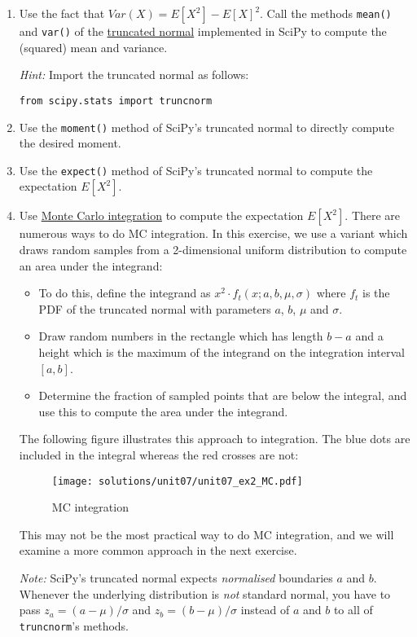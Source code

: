 \documentclass{scrartcl}
\providecommand{\tightlist}{%
      \setlength{\itemsep}{0pt}\setlength{\parskip}{0pt}}
\begin{document}
\begin{enumerate}
\def\labelenumi{\arabic{enumi}.}
\item
  Use the fact that \(Var(X) = E[X^2] - E[X]^2\). Call the methods
  \texttt{mean()} and \texttt{var()} of the
  \href{https://docs.scipy.org/doc/scipy/reference/generated/scipy.stats.truncnorm.html}{truncated
  normal} implemented in SciPy to compute the (squared) mean and
  variance.

  \emph{Hint:} Import the truncated normal as follows:

\begin{verbatim}
from scipy.stats import truncnorm
\end{verbatim}
\item
  Use the \texttt{moment()} method of SciPy's truncated normal to
  directly compute the desired moment.
\item
  Use the \texttt{expect()} method of SciPy's truncated normal to
  compute the expectation \(E[X^2]\).
\item
  Use \href{https://en.wikipedia.org/wiki/Monte_Carlo_integration}{Monte
  Carlo integration} to compute the expectation \(E[X^2]\). There are
  numerous ways to do MC integration. In this exercise, we use a variant
  which draws random samples from a 2-dimensional uniform distribution
  to compute an area under the integrand:

  \begin{itemize}
  \tightlist
  \item
    To do this, define the integrand as
    \(x^2 \cdot f_t(x;a,b,\mu,\sigma)\) where \(f_t\) is the PDF of the
    truncated normal with parameters \(a\), \(b\), \(\mu\) and
    \(\sigma\).
  \item
    Draw random numbers in the rectangle which has length \(b-a\) and a
    height which is the maximum of the integrand on the integration
    interval \([a,b]\).
  \item
    Determine the fraction of sampled points that are below the
    integral, and use this to compute the area under the integrand.
  \end{itemize}

  The following figure illustrates this approach to integration. The
  blue dots are included in the integral whereas the red crosses are
  not:

  \begin{figure}
  \centering
  \texttt{[image: solutions/unit07/unit07\_ex2\_MC.pdf]}
  \caption{MC integration}
  \end{figure}

  This may not be the most practical way to do MC integration, and we
  will examine a more common approach in the next exercise.

  \emph{Note:} SciPy's truncated normal expects \emph{normalised}
  boundaries \(a\) and \(b\). Whenever the underlying distribution is
  \emph{not} standard normal, you have to pass \(z_a = (a-\mu)/\sigma\)
  and \(z_b = (b-\mu)/\sigma\) instead of \(a\) and \(b\) to all of
  \texttt{truncnorm}'s methods.
\end{enumerate}
\end{document}
